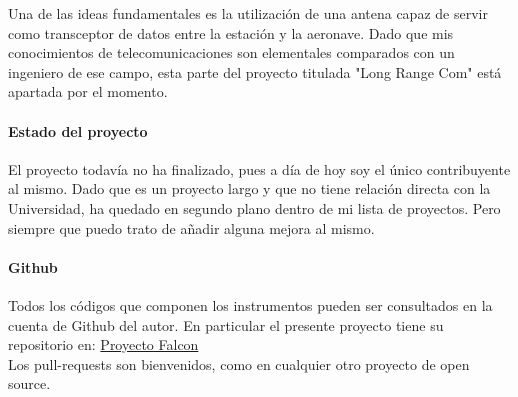 Una de las ideas fundamentales es la utilización de una antena capaz de servir como transceptor de datos entre la estación y la aeronave. Dado que mis conocimientos de telecomunicaciones son elementales comparados con un ingeniero de ese campo, esta parte del proyecto titulada "Long Range Com" está apartada por el momento.

\paragraph{Estado del proyecto}

El proyecto todavía no ha finalizado, pues a día de hoy soy el único contribuyente al mismo. Dado que es un proyecto largo y que no tiene relación directa con la Universidad, ha quedado en segundo plano dentro de mi lista de proyectos. Pero siempre que puedo trato de añadir alguna mejora al mismo.

\paragraph{Github}

Todos los códigos que componen los instrumentos pueden ser consultados en la cuenta de Github del autor. En particular el presente proyecto tiene su repositorio en: \href{https://github.com/jorgepiloto/falcon}{Proyecto Falcon}\\

Los pull-requests son bienvenidos, como en cualquier otro proyecto de open source.





